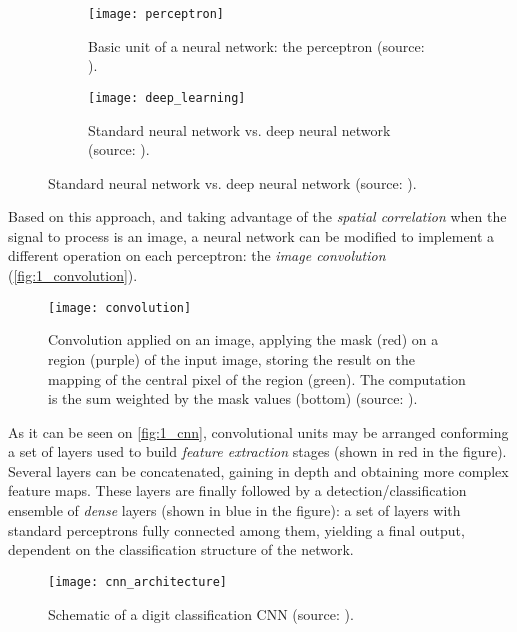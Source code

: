 \begin{figure}[h]
	\centering
	\begin{subfigure}[t]{0.35\linewidth}
		\centering
		\texttt{[image: perceptron]}
		\caption{Basic unit of a neural network: the perceptron (source: \cite{tfg}).}
		\label{fig:1_perceptron}
	\end{subfigure}
	\begin{subfigure}[t]{0.5\linewidth}
		\centering
		\texttt{[image: deep\_learning]}
		\caption{Standard neural network vs. deep neural network (source: \cite{tfg}).}
		\label{fig:1_deep_learning}
	\end{subfigure}
\end{figure}

\begin{figure}[h]

\end{figure}

Based on this approach, and taking advantage of the \textit{spatial correlation} when the signal to process is an image, a neural network can be modified to implement a different operation on each perceptron: the \textit{image convolution} (\autoref{fig:1_convolution}).

\begin{figure}[h]
	\centering
	\texttt{[image: convolution]}
	\caption{Convolution applied on an image, applying the mask (red) on a region  (purple) of the input image, storing the result on the mapping of the central pixel of the region (green). The computation is the sum weighted by the mask values (bottom) (source: \cite{tfg}).}
	\label{fig:1_convolution}
\end{figure}

As it can be seen on \autoref{fig:1_cnn}, convolutional units may be arranged conforming a set of layers used to build \textit{feature extraction} stages (shown in red in the figure). Several layers can be concatenated, gaining in depth and obtaining more complex feature maps. These layers are finally followed by a detection/classification ensemble of \textit{dense} layers (shown in blue in the figure): a set of layers with standard perceptrons fully connected among them, yielding a final output, dependent on the classification structure of the network.

\begin{figure}[h]
	\centering
	\texttt{[image: cnn\_architecture]}
	\caption{Schematic of a digit classification CNN (source: \cite{tfg}).}
	\label{fig:1_cnn}
\end{figure}

